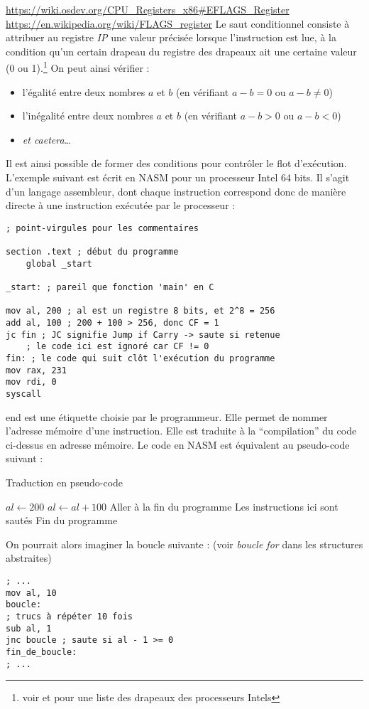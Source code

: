 \documentclass[../../../main.tex]{subfiles}
\begin{document}
\urldef{\urlrflagsa}\url{https://wiki.osdev.org/CPU_Registers_x86#EFLAGS_Register}
\urldef{\urlrflagsb}\url{https://en.wikipedia.org/wiki/FLAGS_register}
Le saut conditionnel consiste à attribuer au registre \textit{IP} une valeur précisée lorsque l'instruction est lue, à la condition qu'un certain drapeau du registre des drapeaux ait une certaine valeur (0 ou 1).\footnote{voir \urlrflagsa et \urlrflagsb pour une liste des drapeaux des processeurs Intels} On peut ainsi vérifier :
\begin{itemize}
	\item l'égalité entre deux nombres $a$ et $b$ (en vérifiant $a - b = 0$ ou $a - b \neq{0}$)
	\item l'inégalité entre deux nombres $a$ et $b$ (en vérifiant $a - b > 0$ ou $a - b < 0$)
	\item \textit{et caetera}\dots
\end{itemize}
Il est ainsi possible de former des conditions pour contrôler le flot d'exécution. L'exemple suivant est écrit en NASM pour un processeur Intel 64 bits. Il s'agit d'un langage assembleur, dont chaque instruction correspond donc de manière directe à une instruction exécutée par le processeur :
\begin{verbatim}
; point-virgules pour les commentaires

section .text ; début du programme
	global _start

_start: ; pareil que fonction 'main' en C

mov al, 200 ; al est un registre 8 bits, et 2^8 = 256
add al, 100 ; 200 + 100 > 256, donc CF = 1
jc fin ; JC signifie Jump if Carry -> saute si retenue
	; le code ici est ignoré car CF != 0
fin: ; le code qui suit clôt l'exécution du programme
mov rax, 231
mov rdi, 0
syscall
\end{verbatim}
\textsf{end} est une étiquette choisie par le programmeur. Elle permet de nommer l'adresse mémoire d'une instruction. Elle est traduite à la ``compilation'' du code ci-dessus en adresse mémoire. Le code en NASM est équivalent au pseudo-code suivant :
\begin{algorithm}
\caption{Traduction en pseudo-code}\label{alg:two}
$al\leftarrow 200$\;
$al\leftarrow al + 100$\;
 {
	Aller à la fin du programme\;
} {
	Les instructions ici sont sautés
}
Fin du programme\;
\end{algorithm}\newline
On pourrait alors imaginer la boucle suivante : (voir \textit{boucle for} dans les structures abstraites)
\begin{verbatim}
; ...
mov al, 10
boucle:
; trucs à répéter 10 fois
sub al, 1
jnc boucle ; saute si al - 1 >= 0
fin_de_boucle:
; ...
\end{verbatim}
\end{document}
